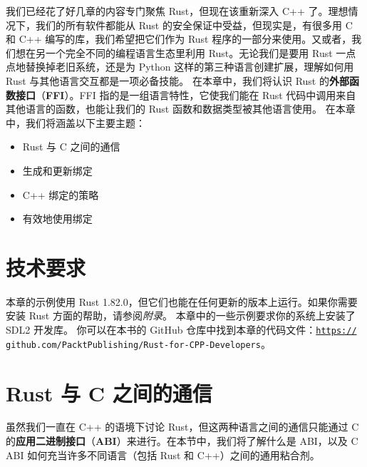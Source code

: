 我们已经花了好几章的内容专门聚焦 Rust，但现在该重新深入 C++ 了。理想情况下，我们的所有软件都能从 Rust 的安全保证中受益，但现实是，有很多用 C 和 C++ 编写的库，我们希望把它们作为 Rust 程序的一部分来使用。又或者，我们想在另一个完全不同的编程语言生态里利用 Rust。无论我们是要用 Rust 一点点地替换掉老旧系统，还是为 Python 这样的第三种语言创建扩展，理解如何用 Rust 与其他语言交互都是一项必备技能。
\label{idx:idx_ce031a55}
在本章中，我们将认识 Rust 的\textbf{外部函数接口}（\textbf{FFI}）。FFI 指的是一组语言特性，它使我们能在 Rust 代码中调用来自其他语言的函数，也能让我们的 Rust 函数和数据类型被其他语言使用。
在本章中，我们将涵盖以下主要主题：
\begin{itemize}
  \item Rust 与 C 之间的通信
  \item 生成和更新绑定
  \item C++ 绑定的策略
  \item 有效地使用绑定
\end{itemize}
\section{技术要求}
本章的示例使用 Rust 1.\allowbreak{}82.\allowbreak{}0，但它们也能在任何更新的版本上运行。如果你需要安装 Rust 方面的帮助，请参阅\emph{附录}。
本章中的一些示例要求你的系统上安装了 SDL2 开发库。
你可以在本书的 GitHub 仓库中找到本章的代码文件：\href{https://}{\texttt{https://}}
\texttt{github.\allowbreak{}com/\allowbreak{}PacktPublishing/\allowbreak{}Rust-\allowbreak{}for-\allowbreak{}CPP-\allowbreak{}Developers}。
\section{Rust 与 C 之间的通信}
\label{idx:idx_532766c3}
虽然我们一直在 C++ 的语境下讨论 Rust，但这两种语言之间的通信只能通过 C 的\textbf{应用二进制接口}（\textbf{ABI}）来进行。在本节中，我们将了解什么是 ABI，以及 C ABI 如何充当许多不同语言（包括 Rust 和 C++）之间的通用粘合剂。
